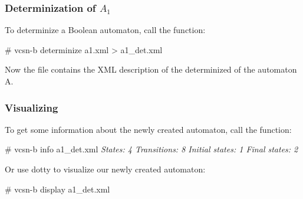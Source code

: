 \subsubsection{Determinization of $A_1$}
To determinize a Boolean automaton, call the 
function:
\begin{shell}
# vcsn-b determinize a1.xml > a1\_det.xml
\end{shell}
Now the file  contains the XML description of the
determinized of the automaton A.

\subsubsection{Visualizing}

To get some information about the newly created automaton, call the
 function:
\begin{shell}
# vcsn-b info a1\_det.xml
\textit{States: 4
Transitions: 8
Initial states: 1
Final states: 2}
\end{shell}
Or use dotty to visualize our newly created automaton:
\begin{shell}
# vcsn-b display a1\_det.xml
\end{shell}

